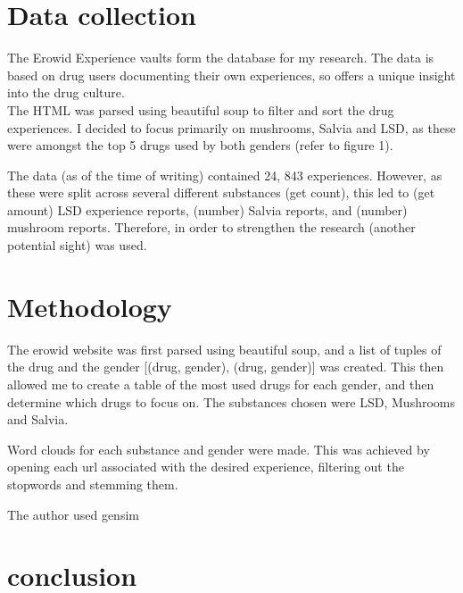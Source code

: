 \documentclass{article}
\begin{document}
\section{Data collection}
The Erowid Experience vaults form the database for my research. The data is based on drug users documenting their own experiences, so offers a unique insight into the drug culture. \\ 
The HTML was parsed using beautiful soup to filter and sort the drug experiences. I decided to focus primarily on mushrooms, Salvia and LSD, as these were amongst the top 5 drugs used by both genders (refer to figure 1).

The data (as of the time of writing) contained 24, 843 experiences. However, as these were split across several different substances (get count), this led to (get amount) LSD experience reports, (number) Salvia reports, and (number) mushroom reports. Therefore, in order to strengthen the research (another potential sight) was used. 

\section{Methodology}

The erowid website was first parsed using beautiful soup, and a list of tuples of the drug and the gender [(drug, gender), (drug, gender)] was created. This then allowed me to create a table of the most used drugs for each gender, and then determine which drugs to focus on. The substances chosen were LSD, Mushrooms and Salvia.

Word clouds for each substance and gender were made. This was achieved by opening each url associated with the desired experience, filtering out the stopwords and stemming them. 

The author used gensim 

\section{conclusion}



\end{document}
